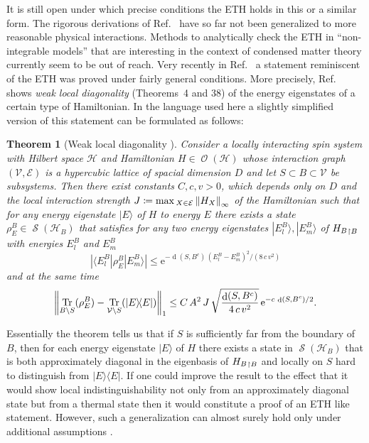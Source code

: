 \documentclass[a4paper,12pt,listof=totoc,index=totoc,bibliography=totoc,headsepline=false,headings=normal,BCOR16.153846mm,DIV12,headinclude,twoside,cleardoublepage=empty,numbers=noenddot,final]{scrreprt}
\theoremstyle{mystyle}
\numberwithin{equation}{section}
\numberwithin{figure}{section}
\numberwithin{lemma}{section}
\newtheorem{theorem}{Theorem}
\numberwithin{theorem}{section}
\numberwithin{corollary}{section}
\numberwithin{definition}{section}
\numberwithin{conjecture}{section}
\numberwithin{observation}{section}
\newcommand{\+}{\mkern2mu}
\newcommand{\coloneqq}{\mathrel{\vcentcolon\mkern-1.2mu=}} %
\renewcommand{\max}{\mathchoice{\operatorname*{max}}{\operatorname*{max}}{\mathrm{max}}{\mathrm{max}}} %
\renewcommand{\H}{H}
\newcommand{\Vset}{\mathcal{V}}
\newcommand{\Eset}{\mathcal{E}}
\newcommand{\bra}[1]{\langle #1|}
\newcommand{\ket}[1]{|#1\rangle}
\newcommand{\ketbra}[2]{\ket{#1}\!\bra{#2}}
\newcommand{\norm}[2][]{
  \ifthenelse{\equal{#1}{}}
    {\left\| {#2} \right\|}
    {\ifthenelse{\equal{#1}{uinv}}
      {\left\vert\kern-0.25ex\left\vert\kern-0.25ex\left\vert {#2} \right\vert\kern-0.25ex\right\vert\kern-0.25ex\right\vert}
      {\left\| {#2} \right\|_{#1}}
    }
}
\newcommand{\compl}[1]{{{#1}^c}}
\newcommand{\trunc}[2]{{#1}_{\upharpoonright \mathnormal{#2}}}
\newcommand{\e}{\mathrm{e}}
\DeclareMathOperator{\1}{\mathds{1}}
\DeclareMathOperator{\Obs}{\mathcal{O}}
\DeclareMathOperator{\Qst}{\mathcal{S}}
\DeclareMathOperator{\Tr}{Tr}
\DeclareMathOperator{\dist}{d}
\newcommand{\mc}[1]{\mathcal{#1}}
\newcommand{\mcH}{\mc{H}}
\begin{document}
It is still open under which precise conditions the ETH holds in this or a similar form.
The rigorous derivations of Ref.~\cite{tasaki98} have so far not been generalized to more reasonable physical interactions.
Methods to analytically check the ETH in ``non-integrable models'' that are interesting in the context of condensed matter theory currently seem to be out of reach.
Very recently in Ref.~\cite{Mueller2013} a statement reminiscent of the ETH was proved under fairly general conditions.
More precisely, Ref.~\cite{Mueller2013} shows \emph{weak local diagonality} (Theorems~4 and 38) of the energy eigenstates of a certain type of Hamiltonian.
In the language used here a slightly simplified version of this statement can be formulated as follows:
\begin{theorem}[Weak local diagonality \cite{Mueller2013}]
  Consider a locally interacting spin system with Hilbert space $\mcH$ and Hamiltonian $\H \in \Obs(\mcH)$ whose interaction graph $(\Vset,\Eset)$ is a hypercubic lattice of spacial dimension $D$ and let $S \subset B \subset \Vset$ be subsystems.
  Then there exist constants $C,c,v > 0$, which depends only on $D$ and the local interaction strength $J \coloneqq \max_{X\in\Eset} \norm[\infty]{\H_X}$ of the Hamiltonian such that for any energy eigenstate $\ket E$ of $\H$ to energy $E$ there exists a state $\rho^B_E \in \Qst(\mcH_B)$ that satisfies for any two energy eigenstates $\ket{E^B_l}, \ket{E^B_m}$ of $\trunc {\H_B} B$ with energies $E^B_l$ and $E^B_m$
  \begin{equation}
    |\bra{E^B_l} \rho^B_E \ket{E^B_m}| \leq \e^{-\dist(S,\compl B)\,(E^B_l-E^B_m)^2/(8\,c\,v^2)}
  \end{equation}
  and at the same time
  \begin{equation}
    \norm[1]{\Tr_{B \setminus S}(\rho^B_E) - \Tr_{\Vset \setminus S}(\ketbra{E}{E}) } \leq C\,A^2\,J\,\sqrt{\frac{\dist(S,\compl B)}{4\,c\,v^2}}\,\e^{-c\,\dist(S,\compl B)/2} .
  \end{equation}
\end{theorem}
Essentially the theorem tells us that if $S$ is sufficiently far from the boundary of $B$, then for each energy eigenstate $\ket{E}$ of $\H$ there exists a state in $\Qst(\mcH_B)$ that is both approximately diagonal in the eigenbasis of $\trunc {\H_B} B$ and locally on $S$ hard to distinguish from $\ketbra{E}{E}$.
If one could improve the result to the effect that it would show local indistinguishability not only from an approximately diagonal state but from a thermal state then it would constitute a proof of an ETH like statement. 
However, such a generalization can almost surely hold only under additional assumptions \cite{Mueller2013}.
\end{document}
